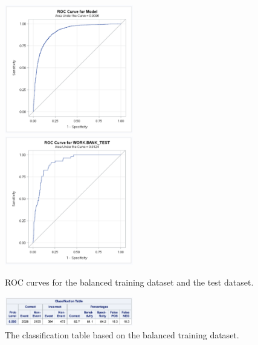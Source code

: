 \documentclass[]{article}
\begin{document}
\begin{figure}
  \centering
    \includegraphics[width=0.5\textwidth]{images/fig22a_ROC.png} 
    \includegraphics[width=0.5\textwidth]{images/fig22b_ROC.png}
  \caption{ROC curves for the balanced training dataset and the test dataset.}
  \label{fig22}
\end{figure}

\begin{figure}
  \centering
    \includegraphics[width=0.5\textwidth]{images/fig23_ctable.png} 
  \caption{The classification table based on the balanced training dataset.}
  \label{fig23}
\end{figure}
\end{document}
